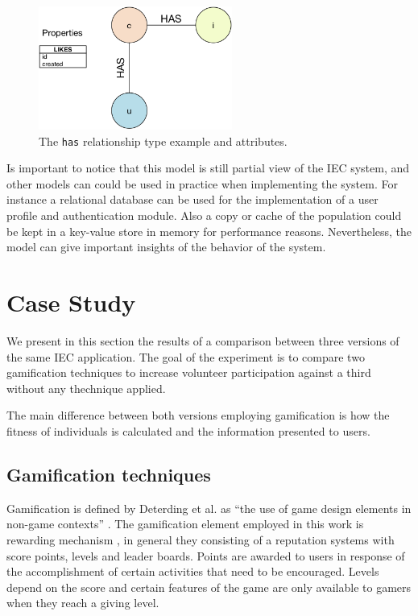 \documentclass[conference]{IEEEtran}
\begin{document}
  
\begin{figure}[!t]
    \centering
        \includegraphics[width=2.5in]{img/edge_properties_has.png}
    \caption{ The {\tt has} relationship type example and attributes.}
    \label{fig:has}
\end{figure}

Is important to notice that this model is still partial view of the IEC system,
and other models can could be used in practice when implementing the system. 
For instance a relational database can be used for the implementation of a
user profile and authentication module. Also a copy or cache of the population 
could be kept in a key-value store in memory for performance reasons. 
Nevertheless, the model can give important insights of the behavior of the 
system.  

\section{Case Study}
\label{sec:experiments}

We present in this section the results of a comparison between three versions
of the same IEC application. The goal of the experiment is to compare two 
gamification techniques to increase volunteer participation against a third 
without any thechnique applied.

The main difference between both versions employing gamification is how the fitness of individuals
is calculated and the information presented to users. 

\subsection{Gamification techniques}
\label{sec:gamification}

Gamification is defined by Deterding et al. as
``the use of game design elements in non-game contexts'' \cite{deterding2011game}.
The gamification element employed in this work is rewarding mechanism 
\cite{dubois2013understanding}, in general they consisting of a reputation systems with score points, 
levels and leader boards. Points are awarded to users in response of
the accomplishment of certain activities that need to be encouraged. Levels depend
on the score and certain features of the game are only available to gamers when 
they reach a giving level.
\end{document}
